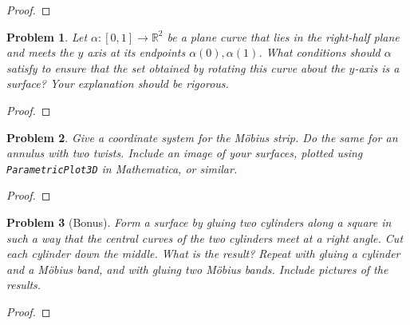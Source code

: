 \documentclass[11pt]{article}
\newtheorem{problem}{Problem}
\begin{document}
\begin{proof}

\end{proof}

\pagebreak 

\begin{problem}
Let $\alpha:[0,1]\to\mathbb R^2$ be a plane curve that lies in the right-half plane and meets the $y$ axis at its endpoints $\alpha(0),\alpha(1)$. What conditions should $\alpha$ satisfy to ensure that the set obtained by rotating this curve about the $y$-axis is a surface? Your explanation should be rigorous.
\end{problem}

\begin{proof}

\end{proof}

\pagebreak 

\begin{problem}
Give a coordinate system for the M\"obius strip. Do the same for an annulus with two twists. Include an image of your surfaces, plotted using \texttt{ParametricPlot3D} in Mathematica, or similar. 
\end{problem}


\begin{proof}

\end{proof}

\pagebreak 


\begin{problem}[Bonus]
Form a surface by gluing two cylinders along a square in such a way that the central curves of the two cylinders meet at a right angle. Cut each cylinder down the middle. What is the result? Repeat with gluing a cylinder and a M\"obius band, and with gluing two M\"obius bands. Include pictures of the results.
\end{problem}

\begin{proof}

\end{proof}
\end{document}
